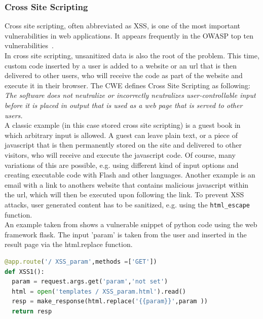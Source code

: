 \documentclass[
	a4paper,
	pagesize,
	pdftex,
	12pt,
	twoside, %
	BCOR=5mm, %
	ngerman,
	fleqn,
	final,
	]{scrartcl}
\begin{document}
\subsubsection{Cross Site Scripting}
Cross site scripting, often abbreviated as XSS, is one of the most important vulnerabilities in web applications. It appears frequently in the OWASP top ten vulnerabilities~\cite{OWASPFoundation.}.\\
In cross site scripting, unsanitized data is also the root of the problem. This time, custom code inserted by a user is added to a website or an url that is then delivered to other users, who will receive the code as part of the website and execute it in their browser. The CWE defines Cross Site Scripting as following: \textit{The software does not neutralize or incorrectly neutralizes user-controllable input before it is placed in output that is used as a web page that is served to other users.}~\cite{CommonWeaknessEnumeration.19.09.2019}\\
A classic example (in this case stored cross site scripting) is a guest book in which arbitrary input is allowed. A guest can leave plain text, or a piece of javascript that is then permanently stored on the site and delivered to other visitors, who will receive and execute the javascript code. Of course, many variations of this are possible, e.g. using different kind of input options and creating executable code with Flash and other languages. Another example is an email with a link to anothers website that contains malicious javascript within the url, which will then be executed upon following the link. 
To prevent XSS attacks, user generated content has to be sanitized, e.g. using the \texttt{html\_escape} function.\\
An example taken from \cite{Micheelsen.2016} shows a vulnerable snippet of python code using the web framework flask. The input 'param' is taken from the user and inserted in the result page via the html.replace function.
\begin{lstlisting}[language=Python, showstringspaces=False]
@app.route('/ XSS_param',methods =['GET'])
def XSS1():
  param = request.args.get('param','not set')
  html = open('templates / XSS_param.html').read()
  resp = make_response(html.replace('{{param}}',param ))
  return resp
\end{lstlisting}
\end{document}

